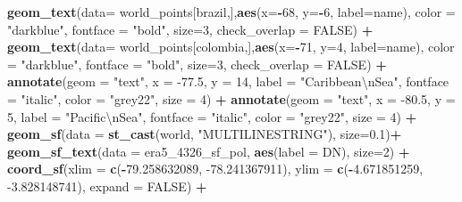 \documentclass[12pt,oneside]{reedthesis}
\newenvironment{Shaded}{\begin{snugshade}}{\end{snugshade}}
\newcommand{\CharTok}[1]{\textcolor[rgb]{0.31,0.60,0.02}{#1}}
\newcommand{\DataTypeTok}[1]{\textcolor[rgb]{0.13,0.29,0.53}{#1}}
\newcommand{\DecValTok}[1]{\textcolor[rgb]{0.00,0.00,0.81}{#1}}
\newcommand{\FloatTok}[1]{\textcolor[rgb]{0.00,0.00,0.81}{#1}}
\newcommand{\KeywordTok}[1]{\textcolor[rgb]{0.13,0.29,0.53}{\textbf{#1}}}
\newcommand{\NormalTok}[1]{#1}
\newcommand{\OperatorTok}[1]{\textcolor[rgb]{0.81,0.36,0.00}{\textbf{#1}}}
\newcommand{\OtherTok}[1]{\textcolor[rgb]{0.56,0.35,0.01}{#1}}
\newcommand{\StringTok}[1]{\textcolor[rgb]{0.31,0.60,0.02}{#1}}
\begin{document}
\begin{Shaded}
\begin{Highlighting}[]
\StringTok{  }\KeywordTok{geom_text}\NormalTok{(}\DataTypeTok{data=}\NormalTok{ world_points[brazil,],}\KeywordTok{aes}\NormalTok{(}\DataTypeTok{x=}\OperatorTok{-}\DecValTok{68}\NormalTok{, }\DataTypeTok{y=}\OperatorTok{-}\DecValTok{6}\NormalTok{, }\DataTypeTok{label=}\NormalTok{name), }\DataTypeTok{color =} \StringTok{"darkblue"}\NormalTok{, }\DataTypeTok{fontface =} \StringTok{"bold"}\NormalTok{, }\DataTypeTok{size=}\DecValTok{3}\NormalTok{, }\DataTypeTok{check_overlap =} \OtherTok{FALSE}\NormalTok{) }\OperatorTok{+}
\StringTok{  }\KeywordTok{geom_text}\NormalTok{(}\DataTypeTok{data=}\NormalTok{ world_points[colombia,],}\KeywordTok{aes}\NormalTok{(}\DataTypeTok{x=}\OperatorTok{-}\DecValTok{71}\NormalTok{, }\DataTypeTok{y=}\DecValTok{4}\NormalTok{, }\DataTypeTok{label=}\NormalTok{name), }\DataTypeTok{color =} \StringTok{"darkblue"}\NormalTok{, }\DataTypeTok{fontface =} \StringTok{"bold"}\NormalTok{, }\DataTypeTok{size=}\DecValTok{3}\NormalTok{, }\DataTypeTok{check_overlap =} \OtherTok{FALSE}\NormalTok{) }\OperatorTok{+}
\StringTok{  }\KeywordTok{annotate}\NormalTok{(}\DataTypeTok{geom =} \StringTok{"text"}\NormalTok{, }\DataTypeTok{x =} \FloatTok{-77.5}\NormalTok{, }\DataTypeTok{y =} \DecValTok{14}\NormalTok{, }\DataTypeTok{label =} \StringTok{"Caribbean}\CharTok{\textbackslash{}n}\StringTok{Sea"}\NormalTok{, }\DataTypeTok{fontface =} \StringTok{"italic"}\NormalTok{, }\DataTypeTok{color =} \StringTok{"grey22"}\NormalTok{, }\DataTypeTok{size =} \DecValTok{4}\NormalTok{) }\OperatorTok{+}\StringTok{ }
\StringTok{  }\KeywordTok{annotate}\NormalTok{(}\DataTypeTok{geom =} \StringTok{"text"}\NormalTok{, }\DataTypeTok{x =} \FloatTok{-80.5}\NormalTok{, }\DataTypeTok{y =} \DecValTok{5}\NormalTok{, }\DataTypeTok{label =} \StringTok{"Pacific}\CharTok{\textbackslash{}n}\StringTok{Sea"}\NormalTok{, }\DataTypeTok{fontface =} \StringTok{"italic"}\NormalTok{, }\DataTypeTok{color =} \StringTok{"grey22"}\NormalTok{, }\DataTypeTok{size =} \DecValTok{4}\NormalTok{) }\OperatorTok{+}
\StringTok{  }\KeywordTok{geom_sf}\NormalTok{(}\DataTypeTok{data =} \KeywordTok{st_cast}\NormalTok{(world, }\StringTok{"MULTILINESTRING"}\NormalTok{),  }\DataTypeTok{size=}\FloatTok{0.1}\NormalTok{)}\OperatorTok{+}
\StringTok{  }\KeywordTok{geom_sf_text}\NormalTok{(}\DataTypeTok{data =}\NormalTok{ era5_}\DecValTok{4326}\NormalTok{_sf_pol, }\KeywordTok{aes}\NormalTok{(}\DataTypeTok{label =}\NormalTok{ DN), }\DataTypeTok{size=}\DecValTok{2}\NormalTok{) }\OperatorTok{+}
\StringTok{  }\KeywordTok{coord_sf}\NormalTok{(}\DataTypeTok{xlim =} \KeywordTok{c}\NormalTok{(}\OperatorTok{-}\FloatTok{79.258632089}\NormalTok{, }\FloatTok{-78.241367911}\NormalTok{), }\DataTypeTok{ylim =} \KeywordTok{c}\NormalTok{(}\OperatorTok{-}\FloatTok{4.671851259}\NormalTok{, }\FloatTok{-3.828148741}\NormalTok{), }\DataTypeTok{expand =} \OtherTok{FALSE}\NormalTok{) }\OperatorTok{+}

\end{Highlighting}
\end{Shaded}
\end{document}
